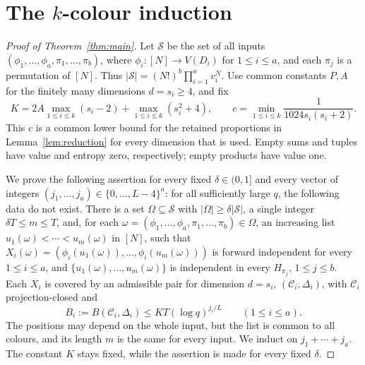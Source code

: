 \documentclass[11pt,a4paper]{article}
\numberwithin{equation}{section}
\newcommand{\cC}{\mathcal C}
\newcommand{\cS}{\mathcal S}
\begin{document}
\section{The \texorpdfstring{$k$}{k}-colour induction}
\label{sec:induction}

\begin{proof}[Proof of Theorem~\ref{thm:main}]
Let $\cS$ be the set of all inputs
$(\phi_1,\ldots,\phi_a,\pi_1,\ldots,\pi_b)$, where
$\phi_i:[N]\to V(D_i)$ for $1\le i\le a$, and each $\pi_j$
is a permutation of $[N]$.
Thus $|\cS|=(N!)^b\prod_{i=1}^a v_i^N$.
Use common constants $P,A$ for the finitely many dimensions
$d=s_i\ge4$, and fix
\[
 K=2A\max_{1\le i\le k}(s_i-2)
     +\max_{1\le i\le k}(s_i^2+4),\qquad
 c=\min_{1\le i\le k}\frac1{1024s_i(s_i+2)}.
\]
This $c$ is a common lower bound for the retained proportions in
Lemma~\ref{lem:reduction} for every dimension that is used.
Empty sums and tuples have value and entropy zero, respectively;
empty products have value one.

We prove the following assertion for every fixed
$\delta\in(0,1]$ and every vector of integers
$(j_1,\ldots,j_a)\in\{0,\ldots,L-4\}^a$:
for all sufficiently large $q$, the following data do not exist.
There is a set $\Omega\subseteq\cS$ with
$|\Omega|\ge\delta|\cS|$, a single integer
$\delta T\le m\le T$, and, for each
$\omega=(\phi_1,\ldots,\phi_a,\pi_1,\ldots,\pi_b)\in\Omega$,
an increasing list $u_1(\omega)<\cdots<u_m(\omega)$ in $[N]$, such that
$X_i(\omega)=(\phi_i(u_1(\omega)),\ldots,
\phi_i(u_m(\omega)))$ is forward independent for every $1\le i\le a$,
and $\{u_1(\omega),\ldots,u_m(\omega)\}$ is independent in
every $H_{\pi_j}$, $1\le j\le b$.
Each $X_i$ is covered by an admissible pair for dimension $d=s_i$,
$(\cC_i,\Delta_i)$, with $\cC_i$ projection-closed and
\begin{equation}\label{eq:bounds}
 B_i:=B(\cC_i,\Delta_i)
 \le KT(\log q)^{j_i/L}\qquad(1\le i\le a).
\end{equation}
The positions may depend on the whole input, but the list
is common to all colours, and its length $m$ is the same for
every input. We induct on $j_1+\cdots+j_a$.
The constant $K$ stays fixed, while the assertion is made for
every fixed $\delta$.


\end{proof}
\end{document}

